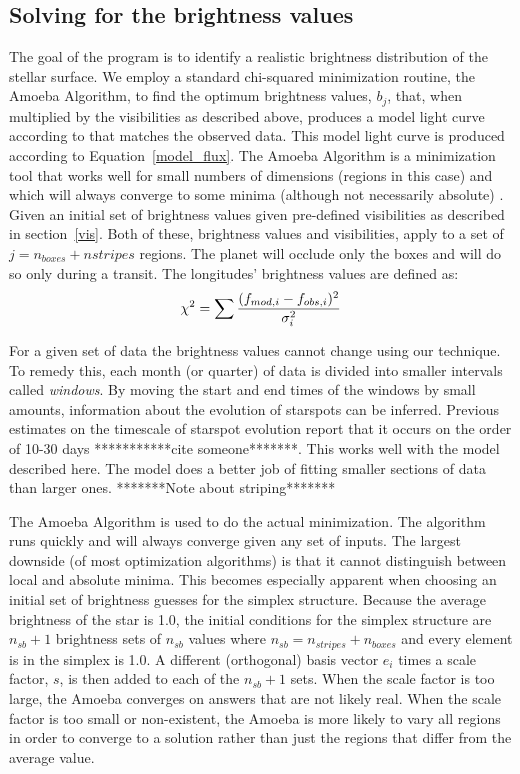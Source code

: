 

\subsection{Solving for the brightness values \label{flux}}
The goal of the program is to identify a realistic brightness distribution of the stellar surface. We employ a standard chi-squared minimization routine, the Amoeba Algorithm, to find the optimum brightness values, $b_j$, that, when multiplied by the visibilities as described above, produces a model light curve according to that matches the observed data. This model light curve is produced according to Equation~\ref{model_flux}. The Amoeba Algorithm is a minimization tool that works well for small numbers of dimensions (regions in this case) and which will always converge to some minima (although not necessarily absolute) \citep{NR}. Given an initial set of brightness values given pre-defined visibilities as described in section~\ref{vis}. Both of these, brightness values and visibilities, apply to a set of $j = n_{boxes} + n{stripes}$ regions. The planet will occlude only the boxes and will do so only during a transit. The longitudes' brightness values are defined as:
\begin{equation}
	\chi^2 = \sum \frac{(\mbox{$f_{mod,i}$} - \mbox{$f_{obs,i}$})^2}{\sigma_i^2}
\end{equation}



For a given set of data the brightness values cannot change using our technique. To remedy this, each month (or quarter) of data is divided into smaller intervals called {\it windows}. By moving the start and end times of the windows by small amounts, information about the evolution of starspots can be inferred. Previous estimates on the timescale of starspot evolution report that it occurs on the order of 10-30 days ***********cite someone*******. This works well with the model described here. The model does a better job of fitting smaller sections of data than larger ones. *******Note about striping*******


The Amoeba Algorithm is used to do the actual minimization. The algorithm runs quickly and will always converge given any set of inputs. The largest downside (of most optimization algorithms) is that it cannot distinguish between local and absolute minima. This becomes especially apparent when choosing an initial set of brightness guesses for the simplex structure. Because the average brightness of the star is 1.0, the initial conditions for the simplex structure are $n_{sb} + 1$ brightness sets of $n_{sb}$ values where $n_{sb} = n_{stripes} + n_{boxes}$ and every element is in the simplex is 1.0. A different (orthogonal) basis vector $e_i$ times a scale factor, $s$, is then added to each of the $n_{sb} + 1$ sets. When the scale factor is too large, the Amoeba converges on answers that are not likely real. When the scale factor is too small or non-existent, the Amoeba is more likely to vary all regions in order to converge to a solution rather than just the regions that differ from the average value.




